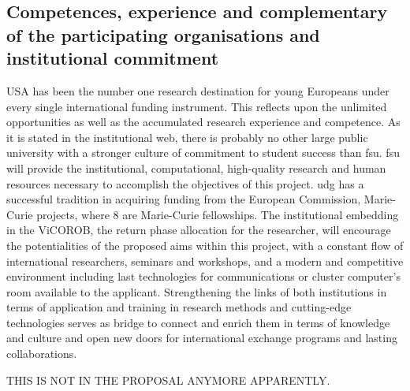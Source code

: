 {\color{red} \subsection{Competences, experience and complementary of the participating organisations and institutional commitment}
\label{sec:competences}

USA has been the number one research destination for young Europeans under every single international funding instrument. 
This reflects upon the unlimited opportunities as well as the accumulated research experience and competence.
As it is stated in the institutional web, there is probably no other large public university with a stronger culture of commitment to student success than \ac{fsu}.
\ac{fsu} will provide the institutional, computational, high-quality research and human resources necessary to accomplish the objectives of this project.
\ac{udg} has a successful tradition in acquiring funding from the European Commission, Marie-Curie projects, where 8 are Marie-Curie fellowships.
The institutional embedding in the ViCOROB, the return phase allocation for the researcher, will encourage the potentialities of the proposed aims within this project, with a constant flow of international researchers, seminars and workshops, and a modern and competitive environment including last technologies for communications or cluster computer's room available to the applicant.
Strengthening the links of both institutions in terms of application and training in research methods and cutting-edge technologies serves as bridge to connect and enrich them in terms of knowledge and culture and open new doors for international exchange programs and lasting collaborations.

THIS IS NOT IN THE PROPOSAL ANYMORE APPARENTLY.

}
\newpage

